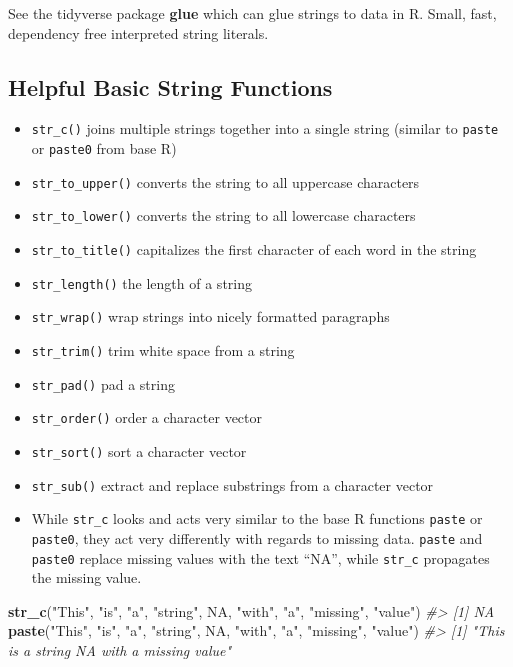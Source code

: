 \documentclass[]{book}
\newenvironment{Shaded}{\begin{snugshade}}{\end{snugshade}}
\newcommand{\KeywordTok}[1]{\textcolor[rgb]{0.13,0.29,0.53}{\textbf{#1}}}
\newcommand{\StringTok}[1]{\textcolor[rgb]{0.31,0.60,0.02}{#1}}
\newcommand{\CommentTok}[1]{\textcolor[rgb]{0.56,0.35,0.01}{\textit{#1}}}
\newcommand{\OtherTok}[1]{\textcolor[rgb]{0.56,0.35,0.01}{#1}}
\newcommand{\NormalTok}[1]{#1}
\providecommand{\tightlist}{%
  \setlength{\itemsep}{0pt}\setlength{\parskip}{0pt}}
\newenvironment{rmdblock}[1]
  {\begin{shaded*}
  \begin{itemize}
  \renewcommand{\labelitemi}{
    \raisebox{-.7\height}[0pt][0pt]{
      {\setkeys{Gin}{width=3em,keepaspectratio}\texttt{[image: images/\#1]}}
    }
  }
  \item
  }
  {
  \end{itemize}
  \end{shaded*}
  }
\newenvironment{rmdcaution}
  {\begin{rmdblock}{caution}}
  {\end{rmdblock}}
\let\BeginKnitrBlock\begin \let\EndKnitrBlock\end
\begin{document}
\BeginKnitrBlock{rmdtip}
See the tidyverse package \textbf{glue} which can glue strings to data
in R. Small, fast, dependency free interpreted string literals.
\EndKnitrBlock{rmdtip}

\subsection{Helpful Basic String
Functions}\label{helpful-basic-string-functions}

\begin{itemize}
\tightlist
\item
  \texttt{str\_c()} joins multiple strings together into a single string
  (similar to \texttt{paste} or \texttt{paste0} from base R)
\item
  \texttt{str\_to\_upper()} converts the string to all uppercase
  characters
\item
  \texttt{str\_to\_lower()} converts the string to all lowercase
  characters
\item
  \texttt{str\_to\_title()} capitalizes the first character of each word
  in the string
\item
  \texttt{str\_length()} the length of a string
\item
  \texttt{str\_wrap()} wrap strings into nicely formatted paragraphs
\item
  \texttt{str\_trim()} trim white space from a string
\item
  \texttt{str\_pad()} pad a string
\item
  \texttt{str\_order()} order a character vector
\item
  \texttt{str\_sort()} sort a character vector
\item
  \texttt{str\_sub()} extract and replace substrings from a character
  vector
\end{itemize}

\begin{rmdcaution}
While \texttt{str\_c} looks and acts very similar to the base R
functions \texttt{paste} or \texttt{paste0}, they act very differently
with regards to missing data. \texttt{paste} and \texttt{paste0} replace
missing values with the text ``NA'', while \texttt{str\_c} propagates
the missing value.
\end{rmdcaution}

\begin{Shaded}
\begin{Highlighting}[]
\KeywordTok{str_c}\NormalTok{(}\StringTok{"This"}\NormalTok{, }\StringTok{"is"}\NormalTok{, }\StringTok{"a"}\NormalTok{, }\StringTok{"string"}\NormalTok{, }\OtherTok{NA}\NormalTok{, }\StringTok{"with"}\NormalTok{, }\StringTok{"a"}\NormalTok{, }\StringTok{"missing"}\NormalTok{, }\StringTok{"value"}\NormalTok{)}
\CommentTok{#> [1] NA}
\KeywordTok{paste}\NormalTok{(}\StringTok{"This"}\NormalTok{, }\StringTok{"is"}\NormalTok{, }\StringTok{"a"}\NormalTok{, }\StringTok{"string"}\NormalTok{, }\OtherTok{NA}\NormalTok{, }\StringTok{"with"}\NormalTok{, }\StringTok{"a"}\NormalTok{, }\StringTok{"missing"}\NormalTok{, }\StringTok{"value"}\NormalTok{)}
\CommentTok{#> [1] "This is a string NA with a missing value"}
\end{Highlighting}
\end{Shaded}
\end{document}
